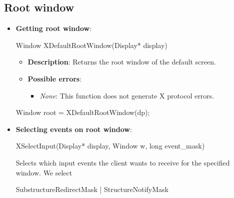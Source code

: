 \documentclass{report}
\begin{document}
    \pagebreak 
    \subsection{Root window}
    \begin{itemize}
        \item \textbf{Getting root window}: 
            \bigbreak \noindent 
            \begin{cppcode}
                Window XDefaultRootWindow(Display* display)
            \end{cppcode}
            \begin{itemize}
                \item \textbf{Description}: Returns the root window of the default screen.
                \item \textbf{Possible errors}:
                    \begin{itemize}
                        \item \textit{None}: This function does not generate X protocol errors.
                    \end{itemize}
            \end{itemize}
            \bigbreak \noindent 
            \begin{bashcode}
                Window root = XDefaultRootWindow(dp);
            \end{bashcode}
        \item \textbf{Selecting events on root window}:
            \bigbreak \noindent 
            \begin{cppcode}
                XSelectInput(Display* display, Window w, long event_mask)
            \end{cppcode}
            \bigbreak \noindent
            Selects which input events the client wants to receive for the specified window.
            \bigbreak \noindent 
            We select 
            \bigbreak \noindent 
            \begin{cppcode}
            SubstructureRedirectMask | StructureNotifyMask
            \end{cppcode}
    \end{itemize}

    \pagebreak 
\end{document}
